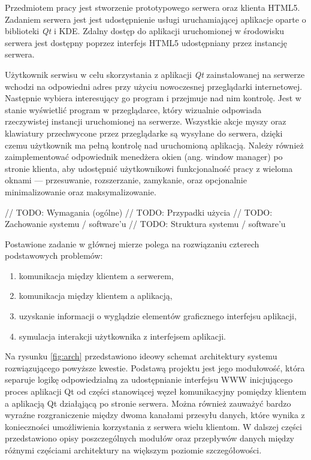 Przedmiotem pracy jest stworzenie prototypowego serwera oraz klienta HTML5. Zadaniem serwera jest jest udostępnienie usługi uruchamiającej aplikacje oparte o biblioteki \emph{Qt} i KDE. Zdalny dostęp do aplikacji uruchomionej w środowisku serwera jest dostępny poprzez interfejs HTML5 udostępniany przez instancję serwera.

Użytkownik serwisu w celu skorzystania z aplikacji \emph{Qt} zainstalowanej na serwerze wchodzi na odpowiedni adres przy użyciu nowoczesnej przeglądarki internetowej. Następnie wybiera interesujący go program i przejmuje nad nim kontrolę. Jest w stanie wyświetlić program w przeglądarce, który wizualnie odpowiada rzeczywistej instancji uruchomionej na serwerze. Wszystkie akcje myszy oraz klawiatury przechwycone przez przeglądarke są wysyłane do serwera, dzięki czemu użytkownik ma pełną kontrolę nad uruchomioną aplikacją. Należy również zaimplementować odpowiednik menedżera okien (ang. window manager) po stronie klienta, aby udostępnić użytkownikowi funkcjonalność pracy z wieloma oknami --- przesuwanie, rozszerzanie, zamykanie, oraz opcjonalnie minimalizowanie oraz maksymalizowanie.

// TODO: Wymagania (ogólne)
// TODO: Przypadki użycia
// TODO: Zachowanie systemu / software'u
// TODO: Struktura systemu / software'u

Postawione zadanie w głównej mierze polega na rozwiązaniu czterech podstawowych problemów:
\begin{enumerate}
  \item komunikacja między klientem a serwerem,
  \item komunikacja między klientem a aplikacją,
  \item uzyskanie informacji o wyglądzie elementów graficznego interfejsu aplikacji,
  \item symulacja interakcji użytkownika z interfejsem aplikacji.
\end{enumerate}

Na rysunku \ref{fig:arch} przedstawiono ideowy schemat architektury systemu rozwiązującego powyższe kwestie. 
Podstawą projektu jest jego modułowość, która separuje logikę odpowiedzialną za udostępnianie interfejsu WWW inicjującego proces aplikacji Qt od części stanowiącej węzeł komunikacyjny pomiędzy klientem a aplikacją Qt działąjącą po stronie serwera.
Można również zauważyć bardzo wyraźne rozgraniczenie między dwoma kanałami przesyłu danych, które wynika z konieczności umożliwienia korzystania z serwera wielu klientom. 
W dalszej części przedstawiono opisy poszczególnych modułów oraz przepływów danych między różnymi częściami architektury na większym poziomie szczegółowości.

